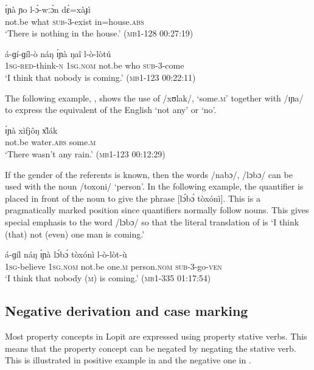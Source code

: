 \documentclass[output=paper,colorlinks,citecolor=brown,draftmode]{langscibook}
\begin{document}
\ea\label{ex:lop:81}
        \gll ɪ́ɲà ɲo l-ɔ̀-wːɔ́n dɛ̀=xàɟì  \\ 
             not.be what \textsc{sub-3-}exist in=house.\textsc{abs} \\
        \glt ‘There is nothing in the house.’ (\textsc{mb1-128} \textsc{00}:27:19)
\z

\ea\label{ex:lop:82}
        \gll á-ɡí-ɡíl-ò náŋ ɪ́ɲà ŋaî l-ò-lòtú \\ 
             1\textsc{sg-red-}think\textsc{{}-n} 1\textsc{sg.nom} not.be who \textsc{sub-}3-come \\
        \glt ‘I think that nobody is coming.’ (\textsc{mb1-123} 00:22:11)
\z

The following example, , shows the use of /xʊlak/, ‘some.\textsc{m}’ together with /ɪɲa/ to express the equivalent of the English ‘not any’ or ‘no’.

\ea\label{ex:lop:83}
        \gll ɪ́ɲà xìfjôŋ x{\U}lák \\
             not.be water.\textsc{abs} some.\textsc{m} \\
        \glt `There wasn't any rain.' (\textsc{mb1-123} \textsc{00:}12:29)
\z

If the gender of the referents is known, then the words /nabɔ/, /lɔbɔ/ can be used with the noun /toxoni/ ‘person’. In the following example, the quantifier is placed in front of the noun to give the phrase [lɔ́bɔ́ tòxónì].  This is a pragmatically marked position since quantifiers normally follow nouns. This gives special emphasis to the word /lɔbɔ/ so that the literal translation of  is ‘I think (that) not (even) one man is coming.’

\ea\label{ex:lop:84}
        \gll á-ɡíl náŋ ɪ́ɲà lɔ́bɔ́ tòxónì l-ò-lòt-ù  \\ 
             1\textsc{sg}{}-believe 1\textsc{sg.nom} not.be one.\textsc{m} person.\textsc{nom} \textsc{sub}{}-3-go-\textsc{ven} \\
        \glt ‘I think that nobody (\textsc{m}) is coming.’   (\textsc{mb1-335} 01:17:54)
\z


\subsection{Negative derivation and case marking}
\label{sec:lop:3.3}
Most property concepts in Lopit are expressed using property stative verbs.  This means that the property concept can be negated by negating the stative verb. This is illustrated in positive example in  and the negative one in . 
\end{document}

